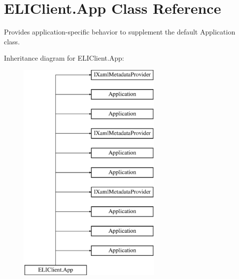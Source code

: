 \hypertarget{class_e_l_i_client_1_1_app}{}\section{E\+L\+I\+Client.\+App Class Reference}
\label{class_e_l_i_client_1_1_app}


Provides application-\/specific behavior to supplement the default Application class.  


Inheritance diagram for E\+L\+I\+Client.\+App\+:\begin{figure}[H]
\begin{center}
\leavevmode
\includegraphics[height=11.000000cm]{de/d49/class_e_l_i_client_1_1_app}
\end{center}
\end{figure}
